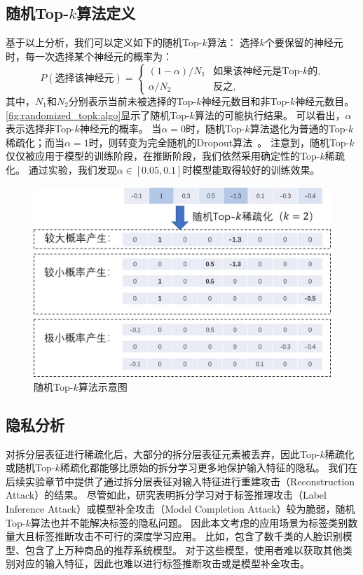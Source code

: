 \subsection{随机Top-$k$算法定义}
基于以上分析，我们可以定义如下的随机Top-$k$算法：
%
选择$k$个要保留的神经元时，每一次选择某个神经元的概率为：
\begin{equation}
\label{eq:randomized_topk:def}
    P(\text{选择该神经元}) = 
    \begin{cases}
        (1 - \alpha) / N_1  & \text{如果该神经元是Top-$k$的,} \\
        \alpha / N_2        & \text{反之,}    
    \end{cases}
\end{equation}
%
其中，$N_1$和$N_2$分别表示当前未被选择的Top-$k$神经元数目和非Top-$k$神经元数目。
%
\autoref{fig:randomized_topk:algo}显示了随机Top-$k$算法的可能执行结果。
%
可以看出，$\alpha$表示选择非Top-$k$神经元的概率。
%
当$\alpha=0$时，随机Top-$k$算法退化为普通的Top-$k$稀疏化；而当$\alpha=1$时，则转变为完全随机的Dropout算法~\cite{srivastava_2014_dropout}。
%
注意到，随机Top-$k$仅仅被应用于模型的训练阶段，在推断阶段，我们依然采用确定性的Top-$k$稀疏化。
%
通过实验，我们发现$\alpha \in [0.05, 0.1]$时模型能取得较好的训练效果。
%
\begin{figure}[h!]
    \centering
    \includegraphics[width=0.7\linewidth]{Z_Resources/randtopk_algorithm.png}
    \caption{随机Top-$k$算法示意图}
    \label{fig:randomized_topk:algo}
\end{figure}


\subsection{隐私分析}
对拆分层表征进行稀疏化后，大部分的拆分层表征元素被丢弃，因此Top-$k$稀疏化或随机Top-$k$稀疏化都能够比原始的拆分学习更多地保护输入特征的隐私。
%
我们在后续实验章节中提供了通过拆分层表征对输入特征进行重建攻击（Reconstruction Attack）的结果。
%
尽管如此，研究表明拆分学习对于标签推理攻击（Label Inference Attack）或模型补全攻击（Model Completion Attack）较为脆弱，随机Top-$k$算法也并不能解决标签的隐私问题。
%
因此本文考虑的应用场景为标签类别数量大且标签推断攻击不可行的深度学习应用。
%
比如，包含了数千类的人脸识别模型、包含了上万种商品的推荐系统模型。
%
对于这些模型，使用者难以获取其他类别对应的输入特征，因此也难以进行标签推断攻击或是模型补全攻击。
%

